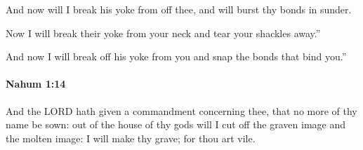 			\begin{versebox}
					\item[BHS] 
					\item[LXX] 
					\item[ASV] And now will I break his yoke from off thee, and will burst thy bonds in sunder.
					\item[NIV] Now I will break their yoke from your neck and tear your shackles away.”
					\item[NRSV] And now I will break off his yoke from you and snap the bonds that bind you.”
			\end{versebox}

		\paragraph{Nahum 1:14} %
			\label{NAHUM-1-14}

			And the LORD hath given a commandment concerning thee, that no more of thy name be sown: out of the house of thy gods will I cut off the graven image and the molten image: I will make thy grave; for thou art vile.

